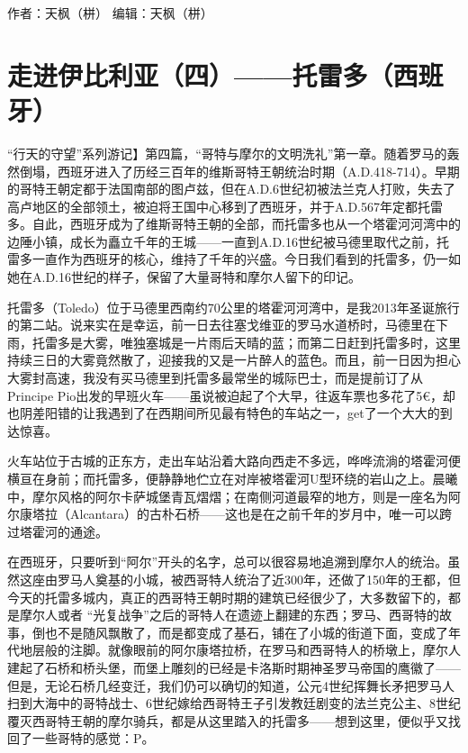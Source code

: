 \documentclass[
]{book}
\begin{document}
作者：天枫（栟）
编辑：天枫（栟）

\hypertarget{ux8d70ux8fdbux4f0aux6bd4ux5229ux4e9aux56dbux6258ux96f7ux591aux897fux73edux7259}{%
\section{走进伊比利亚（四）------托雷多（西班牙）}\label{ux8d70ux8fdbux4f0aux6bd4ux5229ux4e9aux56dbux6258ux96f7ux591aux897fux73edux7259}}

``行天的守望''系列游记】第四篇，``哥特与摩尔的文明洗礼''第一章。随着罗马的轰然倒塌，西班牙进入了历经三百年的维斯哥特王朝统治时期（A.D.418-714）。早期的哥特王朝定都于法国南部的图卢兹，但在A.D.6世纪初被法兰克人打败，失去了高卢地区的全部领土，被迫将王国中心移到了西班牙，并于A.D.567年定都托雷多。自此，西班牙成为了维斯哥特王朝的全部，而托雷多也从一个塔霍河河湾中的边陲小镇，成长为矗立千年的王城------一直到A.D.16世纪被马德里取代之前，托雷多一直作为西班牙的核心，维持了千年的兴盛。今日我们看到的托雷多，仍一如她在A.D.16世纪的样子，保留了大量哥特和摩尔人留下的印记。

托雷多（Toledo）位于马德里西南约70公里的塔霍河河湾中，是我2013年圣诞旅行的第二站。说来实在是幸运，前一日去往塞戈维亚的罗马水道桥时，马德里在下雨，托雷多是大雾，唯独塞城是一片雨后天晴的蓝；而第二日赶到托雷多时，这里持续三日的大雾竟然散了，迎接我的又是一片醉人的蓝色。而且，前一日因为担心大雾封高速，我没有买马德里到托雷多最常坐的城际巴士，而是提前订了从Principe Pio出发的早班火车------虽说被迫起了个大早，往返车票也多花了5€，却也阴差阳错的让我遇到了在西期间所见最有特色的车站之一，get了一个大大的到达惊喜。

火车站位于古城的正东方，走出车站沿着大路向西走不多远，哗哗流淌的塔霍河便横亘在身前；而托雷多，便静静地伫立在对岸被塔霍河U型环绕的岩山之上。晨曦中，摩尔风格的阿尔卡萨城堡青瓦熠熠；在南侧河道最窄的地方，则是一座名为阿尔康塔拉（Alcantara）的古朴石桥------这也是在之前千年的岁月中，唯一可以跨过塔霍河的通途。

在西班牙，只要听到``阿尔''开头的名字，总可以很容易地追溯到摩尔人的统治。虽然这座由罗马人奠基的小城，被西哥特人统治了近300年，还做了150年的王都，但今天的托雷多城内，真正的西哥特王朝时期的建筑已经很少了，大多数留下的，都是摩尔人或者 ``光复战争''之后的哥特人在遗迹上翻建的东西；罗马、西哥特的故事，倒也不是随风飘散了，而是都变成了基石，铺在了小城的街道下面，变成了年代地层般的注脚。就像眼前的阿尔康塔拉桥，在罗马和西哥特人的桥墩上，摩尔人建起了石桥和桥头堡，而堡上雕刻的已经是卡洛斯时期神圣罗马帝国的鹰徽了------但是，无论石桥几经变迁，我们仍可以确切的知道，公元4世纪挥舞长矛把罗马人扫到大海中的哥特战士、6世纪嫁给西哥特王子引发教廷剧变的法兰克公主、8世纪覆灭西哥特王朝的摩尔骑兵，都是从这里踏入的托雷多------想到这里，便似乎又找回了一些哥特的感觉：P。
\end{document}
